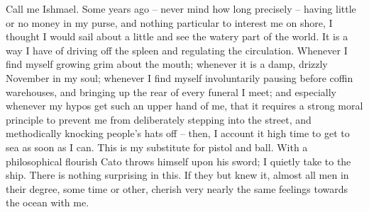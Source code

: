 \documentclass{article}
\begin{document}
\fontsize{12bp}{14bp}\selectfont
\noindent
Call me Ishmael. Some years ago – never mind how long precisely – having
little or no money in my purse, and nothing particular to interest me on
shore, I thought I would sail about a little and see the watery part of
the world. It is a way I have of driving off the spleen and regulating
the circulation. Whenever I find myself growing grim about the mouth;
whenever it is a damp, drizzly November in my soul; whenever I find
myself involuntarily pausing before coffin warehouses, and bringing up
the rear of every funeral I meet; and especially whenever my hypos get
such an upper hand of me, that it requires a strong moral principle to
prevent me from deliberately stepping into the street, and methodically
knocking people’s hats off – then, I account it high time to get to
sea as soon as I can. This is my substitute for pistol and ball. With
a philosophical flourish Cato throws himself upon his sword; I quietly
take to the ship. There is nothing surprising in this. If they but knew
it, almost all men in their degree, some time or other, cherish very
nearly the same feelings towards the ocean with me.
\end{document}
